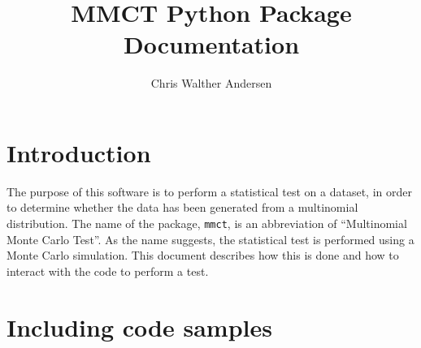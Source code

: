 \documentclass{ol-softwaremanual}
\title{MMCT Python Package \\ Documentation}
\author{Chris Walther Andersen}
\newcommand{\doclink}[2]{\href{#1}{#2}\footnote{\url{#1}}}
\newcommand{\mmct}{\texttt{mmct}}
\begin{document}
\maketitle

\tableofcontents
\listoflistings
\newpage

\section{Introduction}

The purpose of this software is to perform a statistical test on a dataset, in 
order to determine whether the data has been generated from a multinomial 
distribution. The name of the package, \mmct, is an abbreviation of 
\enquote{Multinomial Monte Carlo Test}. As the name suggests, the statistical 
test is performed using a Monte Carlo simulation. This document describes how 
this is done and how to interact with the code to perform a test.

%
%


\section{Including code samples}


\end{document}
